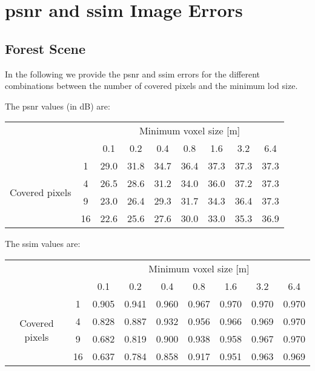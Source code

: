 
\chapter{\acs{psnr} and \acs{ssim} Image Errors}
\label{chap:psnr_and_ssim_errors}

\section{Forest Scene}
In the following we provide the \ac{psnr} and \ac{ssim} errors for the different combinations between the number of covered pixels and the minimum \ac{lod} size.

The \ac{psnr} values (in dB) are:
\begin{center}
    \begin{tabular}{| c | c | c | c | c | c | c | c | c |}
        \cline{3-9}
        \multicolumn{2}{c|}{} & \multicolumn{7}{c|}{Minimum voxel size [m]} \\
        \cline{3-9}
        \multicolumn{2}{c|}{} & 0.1 & 0.2 & 0.4 & 0.8 & 1.6 & 3.2 & 6.4 \\
        \hline
        \multirow{4}{*}{Covered pixels}& 1 & 29.0 & 31.8 & 34.7 & 36.4 & 37.3 & 37.3 & 37.3 \\
        \cline{2-9}
        & 4 & 26.5 & 28.6 & 31.2 & 34.0 & 36.0 & 37.2 & 37.3 \\
        \cline{2-9}
        & 9 & 23.0 & 26.4 & 29.3 & 31.7 & 34.3 & 36.4 & 37.3 \\
        \cline{2-9}
        & 16 & 22.6 & 25.6 & 27.6 & 30.0 & 33.0 & 35.3 & 36.9 \\
        \hline
    \end{tabular}
\end{center}

The \ac{ssim} values are:
\begin{center}
    \begin{tabular}{| c | c | c | c | c | c | c | c | c |}
        \cline{3-9}
        \multicolumn{2}{c|}{} & \multicolumn{7}{c|}{Minimum voxel size [m]} \\
        \cline{3-9}
        \multicolumn{2}{c|}{} & 0.1 & 0.2 & 0.4 & 0.8 & 1.6 & 3.2 & 6.4 \\
        \hline
        \multirow{4}{*}{Covered pixels}& 1 & 0.905 & 0.941 & 0.960 & 0.967 & 0.970 & 0.970 & 0.970 \\
        \cline{2-9}
        & 4 & 0.828 & 0.887 & 0.932 & 0.956 & 0.966 & 0.969 & 0.970 \\
        \cline{2-9}
        & 9 & 0.682 & 0.819 & 0.900 & 0.938 & 0.958 & 0.967 & 0.970 \\
        \cline{2-9}
        & 16 & 0.637 & 0.784 & 0.858 & 0.917 & 0.951 & 0.963 & 0.969 \\
        \hline
    \end{tabular}
\end{center}

